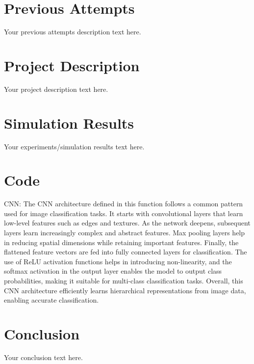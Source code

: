 \documentclass{article}
\begin{document}
\section{Previous Attempts}
Your previous attempts description text here.

\section{Project Description}
Your project description text here.

\section{Simulation Results}
Your experiments/simulation results text here.

\section{Code}
CNN:
    The CNN architecture defined in this function follows a common pattern used for image classification tasks.
    It starts with convolutional layers that learn low-level features such as edges and textures.
    As the network deepens, subsequent layers learn increasingly complex and abstract features.
    Max pooling layers help in reducing spatial dimensions while retaining important features.
    Finally, the flattened feature vectors are fed into fully connected layers for classification.
    The use of ReLU activation functions helps in introducing non-linearity,
    and the softmax activation in the output layer enables the model to output class probabilities,
    making it suitable for multi-class classification tasks.
    Overall, this CNN architecture efficiently learns hierarchical representations from image data,
    enabling accurate classification.

\section{Conclusion}
Your conclusion text here.
\end{document}
